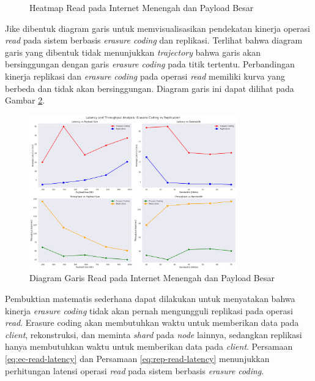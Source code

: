\begin{enumerate}
\begin{figure}[ht]
    \caption{Heatmap Read pada Internet Menengah dan Payload Besar}
      \label{fig:read-bigload-avgnet-heatmap}
  \end{figure}

  Jike dibentuk diagram garis untuk memvisualisasikan pendekatan kinerja operasi \textit{read} pada sistem berbasis \textit{erasure coding} dan replikasi. Terlihat bahwa diagram garis yang dibentuk tidak menunjukkan \textit{trajectory} bahwa garis akan bersinggungan dengan garis \textit{erasure coding} pada titik tertentu. Perbandingan kinerja replikasi dan \textit{erasure coding} pada operasi \textit{read} memiliki kurva yang berbeda dan tidak akan bersinggungan. Diagram garis ini dapat dilihat pada Gambar \ref{fig:read-bigload-avgnet-line}.

  \begin{figure}[ht]
    \centering
    \includegraphics[width=0.8\textwidth]{resources/chapter-4/read_bigload_avgnet_line.png}

    \caption{Diagram Garis Read pada Internet Menengah dan Payload Besar}
    \label{fig:read-bigload-avgnet-line}
  \end{figure}

  Pembuktian matematis sederhana dapat dilakukan untuk menyatakan bahwa kinerja \textit{erasure coding} tidak akan pernah mengungguli replikasi pada operasi \textit{read}. Erasure coding akan membutuhkan waktu untuk memberikan data pada \textit{client}, rekonstruksi, dan meminta \textit{shard} pada \textit{node} lainnya, sedangkan replikasi hanya membutuhkan waktu untuk memberikan data pada \textit{client}. Persamaan \ref{eq:ec-read-latency} dan Persamaan \ref{eq:rep-read-latency} menunjukkan perhitungan latensi operasi \textit{read} pada sistem berbasis \textit{erasure coding}.


\end{enumerate}
